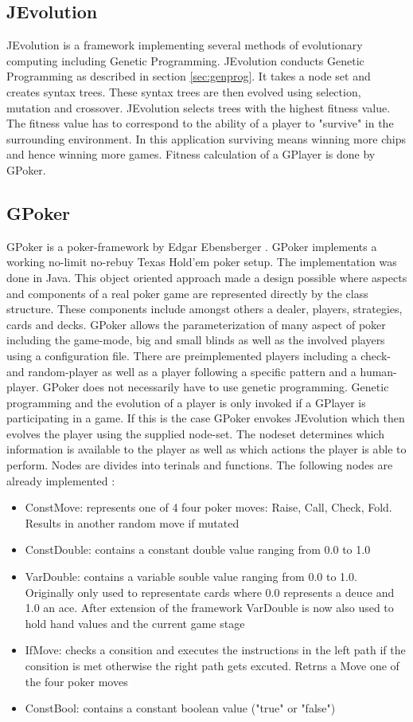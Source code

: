 \documentclass[12pt,fleqn,a4paper]{article}
\begin{document}
\subsection{JEvolution}
JEvolution is a framework implementing several methods of evolutionary computing including Genetic Programming. JEvolution
conducts Genetic Programming as described in section \ref{sec:genprog}. It takes a node set and creates syntax trees. These
syntax trees are then evolved using selection, mutation and crossover. JEvolution selects trees with the highest fitness value. The fitness value has to correspond to the ability of a player to "survive" in the surrounding environment. In this application surviving means winning more chips and hence winning more games. Fitness calculation of a GPlayer is done by GPoker. 

\subsection{GPoker}
GPoker is a poker-framework by Edgar Ebensberger \cite{GPoker}. GPoker implements a working no-limit no-rebuy Texas Hold'em poker setup. The implementation was done in Java. This object oriented approach made a design possible where aspects and components of a real poker game are represented directly by the class structure. These components include amongst others a dealer, players, strategies, cards and decks. GPoker allows the parameterization of many aspect of poker including the game-mode, big and small blinds as well as the involved players using a configuration file. There are preimplemented players including a check- and random-player as well as a player following a specific pattern and a human-player.
GPoker does not necessarily have to use genetic programming. Genetic programming and the evolution of a player is only invoked if a GPlayer is participating in a game.
If this is the case GPoker envokes JEvolution which then evolves the player using the supplied node-set. The nodeset determines which information is available to the player as well as which actions the player is able to perform. Nodes are divides into terinals and functions. The following nodes are already implemented \cite{GPoker}:

\begin{itemize}
	\item ConstMove: represents one of 4 four poker moves: Raise, Call, Check, Fold. Results in another random
	move if mutated
	\item ConstDouble: contains a constant double value ranging from 0.0 to 1.0
	\item VarDouble: contains a variable souble value ranging from 0.0 to 1.0. Originally only used to representate
	cards where 0.0 represents a deuce and 1.0 an ace. After extension of the framework VarDouble is now also used to
	hold hand values and the current game stage
	\item IfMove: checks a consition and executes the instructions in the left path if the consition is met otherwise the 
	right path gets excuted. Retrns a Move one of the four poker moves
	\item ConstBool: contains a constant boolean value ("true" or "false")
\end{itemize}
\end{document}
